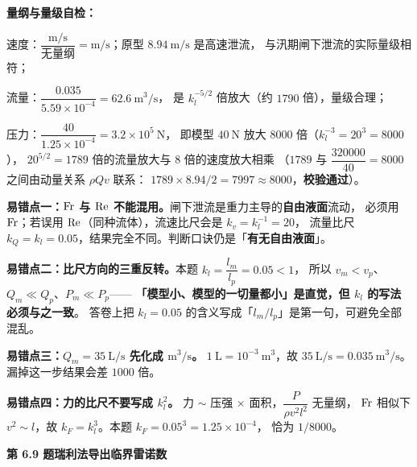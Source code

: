\begin{jie}
\textbf{量纲与量级自检：}
\begin{xiaowen}
\item 速度：$\dfrac{\mathrm{m/s}}{\text{无量纲}}=\mathrm{m/s}$；原型 $8.94\ \mathrm{m/s}$ 是高速泄流，
与汛期闸下泄流的实际量级相符；
\item 流量：$\dfrac{0.035}{5.59\times10^{-4}}=62.6\ \mathrm{m^{3}/s}$，
是 $k_l^{-5/2}$ 倍放大（约 $1790$ 倍），量级合理；
\item 压力：$\dfrac{40}{1.25\times10^{-4}}=3.2\times10^{5}\ \mathrm{N}$，
即模型 $40\ \mathrm{N}$ 放大 $8000$ 倍（$k_l^{-3}=20^{3}=8000$），
$20^{5/2}=1789$ 倍的流量放大与 $8$ 倍的速度放大相乘
（$1789$ 与 $\dfrac{320000}{40}=8000$ 之间由动量关系 $\rho Qv$ 联系：
$1789\times8.94/2=7997\approx8000$，\textbf{校验通过}）。
\end{xiaowen}
\end{jie}

\begin{yicuo}
\textbf{易错点一：$\mathrm{Fr}$ 与 $\mathrm{Re}$ 不能混用。}闸下泄流是重力主导的\textbf{自由液面}流动，
必须用 $\mathrm{Fr}$；若误用 $\mathrm{Re}$（同种流体），流速比尺会是 $k_v=k_l^{-1}=20$，
流量比尺 $k_Q=k_l=0.05$，结果完全不同。判断口诀仍是「\textbf{有无自由液面}」。

\textbf{易错点二：比尺方向的三重反转。}本题 $k_l=\dfrac{l_m}{l_p}=0.05<1$，
所以 $v_m<v_p$、$Q_m\ll Q_p$、$P_m\ll P_p$——
\textbf{「模型小、模型的一切量都小」是直觉，但 $k_l$ 的写法必须与之一致}。
答卷上把 $k_l=0.05$ 的含义写成「$l_m/l_p$」是第一句，可避免全部混乱。

\textbf{易错点三：$Q_m=35\ \mathrm{L/s}$ 先化成 $\mathrm{m^{3}/s}$。}
$1\ \mathrm{L}=10^{-3}\ \mathrm{m^{3}}$，故 $35\ \mathrm{L/s}=0.035\ \mathrm{m^{3}/s}$。
漏掉这一步结果会差 $1000$ 倍。

\textbf{易错点四：力的比尺不要写成 $k_l^{2}$。}
力 $\sim$ 压强 $\times$ 面积，$\dfrac{P}{\rho v^{2}l^{2}}$ 无量纲，
$\mathrm{Fr}$ 相似下 $v^{2}\sim l$，故 $k_F=k_l^{3}$。本题 $k_F=0.05^{3}=1.25\times10^{-4}$，
恰为 $1/8000$。
\end{yicuo}

\noindent\textbf{第 6.9 题\quad 瑞利法导出临界雷诺数}

